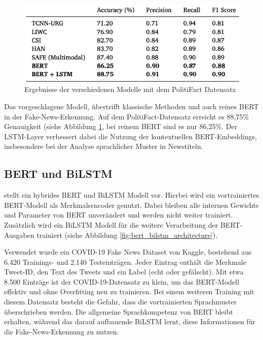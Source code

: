 \begin{figure}[htbp]
    \begin{center}
    \includegraphics[scale=0.5]{static/bert_lstm_politifact.png}
    \caption{\label{fig:bert_lstm_politifact} Ergebnisse der verschiedenen Modelle mit dem PolitiFact Datensatz \cite{RAI202298}}
    \end{center}
\end{figure}

Das vorgeschlagene Modell, übertrifft klassische Methoden und auch reines BERT in der Fake-News-Erkennung. 
Auf dem PolitiFact-Datensatz erreicht es 88,75\% Genauigkeit (siehe Abbildung \ref{fig:bert_lstm_politifact}, bei reinem BERT sind es nur 86,25\%.
Der LSTM-Layer verbessert dabei die Nutzung der kontextuellen BERT-Embeddings, insbesondere bei der Analyse sprachlicher Muster in Newstiteln.

\subsection{BERT und BiLSTM}

\cite{wang2021covid19fakenewsdetection} stellt ein hybrides BERT und BiLSTM Modell vor. Hierbei wird ein vortrainiertes BERT-Modell als 
Merkmalsencoder genutzt. Dabei bleiben alle internen Gewichte und Parameter von BERT unverändert und werden nicht weiter trainiert. 
Zusätzlich wird ein BiLSTM Modell für die weitere Verarbeitung der BERT-Ausgaben trainiert (siehe Abbildung \ref{fig:bert_bilstm_architecture}).

Verwendet wurde ein COVID-19 Fake News Dataset von Kaggle, bestehend aus 6.420 Trainings- und 2.140 Testeinträgen. 
Jeder Eintrag enthält die Merkmale Tweet-ID, den Text des Tweets und ein Label (echt oder gefälscht).
Mit etwa 8.500 Einträge ist der COVID-19-Datensatz zu klein, um das BERT-Modell effektiv und ohne Overfitting neu zu trainieren.
Bei einem weiteren Training mit diesem Datensatz besteht die Gefahr, dass die vortrainierten Sprachmuster überschrieben werden. 
Die allgemeine Sprachkompetenz von BERT bleibt erhalten, während das darauf aufbauende BiLSTM lernt, 
diese Informationen für die Fake-News-Erkennung zu nutzen.

